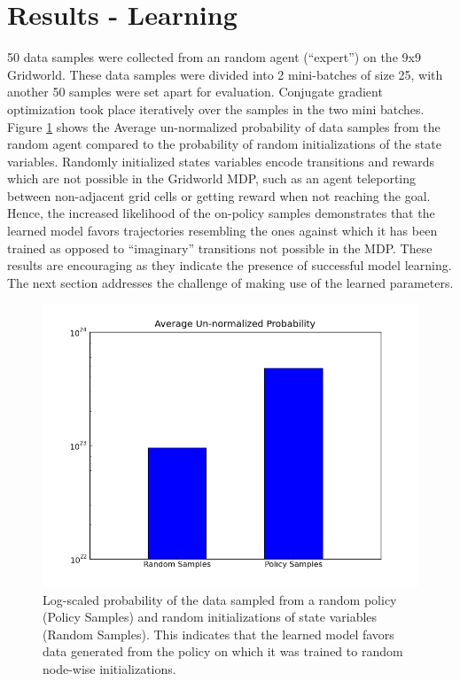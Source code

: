 \documentclass{article} %
\begin{document}
\section{Results - Learning}
50 data samples were collected from an random agent (``expert'') on the 9x9
Gridworld. These data samples were divided into 2 mini-batches of size 25, with
another 50 samples were set apart for evaluation. Conjugate gradient
optimization took place iteratively over the samples in the two mini batches.
Figure \ref{fig:learning} shows the Average un-normalized probability of data
samples from the random agent compared to the probability of random
initializations of the state variables. Randomly initialized states variables
encode transitions and rewards which are not possible in the Gridworld MDP,
such as an agent teleporting between non-adjacent grid cells or getting reward
when not reaching the goal. Hence, the increased likelihood of the on-policy
samples demonstrates that the learned model favors trajectories resembling the
ones against which it has been trained as opposed to ``imaginary'' transitions
not possible in the MDP. These results are encouraging as they indicate the
presence of successful model learning. The next section addresses the challenge
of making use of the learned parameters.

\begin{figure}
  \centering
  \includegraphics[width=.7\textwidth]{figures/graph.png}
  \caption{Log-scaled probability of the data sampled from a random policy (Policy Samples) and random initializations of state variables (Random Samples). This indicates that the learned model favors data generated from the policy on which it was trained to random node-wise initializations.}
  \label{fig:learning}
\end{figure}
\end{document}

